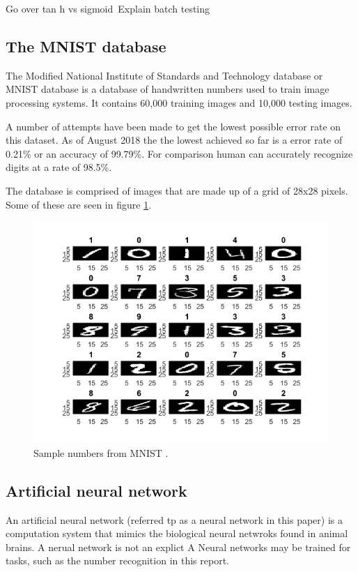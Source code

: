 \documentclass[12pt]{article}
\begin{document}
	Go over tan h vs sigmoid\
	Explain batch testing
	

	\subsection{The MNIST database}
	The Modified National Institute of Standards and Technology database or MNIST database\cite{mnistDATABASE} is a database of handwritten numbers used to train image processing systems. It contains 60,000 training images and 10,000 testing images. 
	
	A number of attempts have been made to get the lowest possible error rate on this dataset. As of August 2018 the  the lowest achieved so far is a error rate of 0.21\% or an accuracy of 99.79\%. For comparison human can accurately recognize digits at a rate of 98.5\%\cite{humanPerf}.
	
	The database is comprised of images that are made up of a grid of 28x28 pixels. Some of these are seen in figure \ref{fig:mathworksmnistneuralnetfinal}. 
	
	\begin{figure}[H]
		\centering
		\includegraphics[width=0.7\linewidth]{mathworks_mnist_neuralnetFinal}
		\caption{Sample numbers from MNIST \cite{matlabNNBeg}.}
		\label{fig:mathworksmnistneuralnetfinal}
	\end{figure}
	
	\subsection{Artificial neural network}
	An artificial neural network (referred tp as a neural network in this paper) is a computation system that mimics the biological neural netwroks found in animal brains. A nerual network is not an explict
	A 
	Neural networks may be trained for tasks, such as the number recognition in this report. 
	
\end{document}
